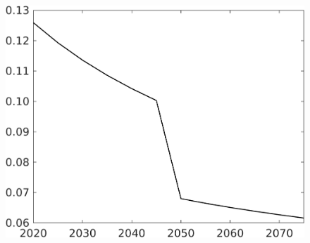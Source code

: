 \documentclass[12pt]{article}
\begin{document}
\begin{figure}[h!!]
\begin{minipage}[]{0.32\textwidth}
	\end{minipage}		
	\begin{minipage}[]{0.32\textwidth}
		\includegraphics[width=1\textwidth]{../../codding_model/own_basedOnFried/optimalPol_010922_revision/figures/all_13Sept22/CompTaufPER_bytaul_Reg0_EY_spillover0_nsk1_xgr0_knspil0_sep0_LFlimit1_emsbase0_countec0_GovRev0_etaa0.79_lgd0.png}
	\end{minipage}	
\end{figure}
\end{document}
